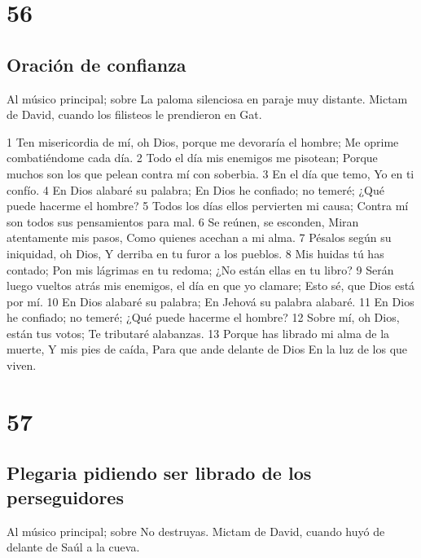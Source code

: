 \chapter{56}

\section*{Oración de confianza}

Al músico principal; sobre La paloma silenciosa en paraje muy distante. Mictam de David, cuando los filisteos le prendieron en Gat.  

1 Ten misericordia de mí, oh Dios, porque me devoraría el hombre;
Me oprime combatiéndome cada día.
2 Todo el día mis enemigos me pisotean;
Porque muchos son los que pelean contra mí con soberbia.
3 En el día que temo,
Yo en ti confío.
4 En Dios alabaré su palabra;
En Dios he confiado; no temeré;
¿Qué puede hacerme el hombre?
5 Todos los días ellos pervierten mi causa;
Contra mí son todos sus pensamientos para mal.
6 Se reúnen, se esconden,
Miran atentamente mis pasos,
Como quienes acechan a mi alma.
7 Pésalos según su iniquidad, oh Dios,
Y derriba en tu furor a los pueblos.
8 Mis huidas tú has contado;
Pon mis lágrimas en tu redoma;
¿No están ellas en tu libro?
9 Serán luego vueltos atrás mis enemigos, el día en que yo clamare;
Esto sé, que Dios está por mí.
10 En Dios alabaré su palabra;
En Jehová su palabra alabaré.
11 En Dios he confiado; no temeré;
¿Qué puede hacerme el hombre?
12 Sobre mí, oh Dios, están tus votos;
Te tributaré alabanzas.
13 Porque has librado mi alma de la muerte,
Y mis pies de caída,
Para que ande delante de Dios
En la luz de los que viven.

\chapter{57}

\section*{Plegaria pidiendo ser librado de los perseguidores}

Al músico principal; sobre No destruyas. Mictam de David, cuando huyó de delante de Saúl a la cueva.

